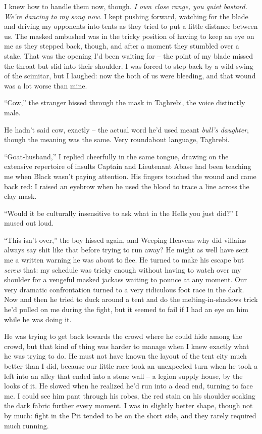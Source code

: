 \documentclass[12pt, openany]{book}
\begin{document}
I knew how to handle them now, though. \textit{I own close range, you quiet bastard. We’re dancing to my song now.} I kept pushing forward, watching for the blade and driving my opponents into tents as they tried to put a little distance between us. The masked ambushed was in the tricky position of having to keep an eye on me as they stepped back, though, and after a moment they stumbled over a stake. That was the opening I’d been waiting for – the point of my blade missed the throat but slid into their shoulder. I was forced to step back by a wild swing of the scimitar, but I laughed: now the both of us were bleeding, and that wound was a lot worse than mine.

“Cow,” the stranger hissed through the mask in Taghrebi, the voice distinctly male.

He hadn’t said cow, exactly – the actual word he’d used meant \textit{bull’s daughter}, though the meaning was the same. Very roundabout language, Taghrebi.

“Goat-husband,” I replied cheerfully in the same tongue, drawing on the extensive repertoire of insults Captain and Lieutenant Abase had been teaching me when Black wasn’t paying attention. His fingers touched the wound and came back red: I raised an eyebrow when he used the blood to trace a line across the clay mask. 

“Would it be culturally insensitive to ask what in the Hells you just did?” I mused out loud.

“This isn’t over,” the boy hissed again, and Weeping Heavens why did villains always say shit like that before trying to run away? He might as well have sent me a written warning he was about to flee. He turned to make his escape but \textit{screw} that: my schedule was tricky enough without having to watch over my shoulder for a vengeful masked jackass waiting to pounce at any moment. Our very dramatic confrontation turned to a very ridiculous foot race in the dark. Now and then he tried to duck around a tent and do the melting-in-shadows trick he’d pulled on me during the fight, but it seemed to fail if I had an eye on him while he was doing it.

He was trying to get back towards the crowd where he could hide among the crowd, but that kind of thing was harder to manage when I knew exactly what he was trying to do. He must not have known the layout of the tent city much better than I did, because our little race took an unexpected turn when he took a left into an alley that ended into a stone wall – a legion supply house, by the looks of it. He slowed when he realized he’d run into a dead end, turning to face me. I could see him pant through his robes, the red stain on his shoulder soaking the dark fabric further every moment. I was in slightly better shape, though not by much: fight in the Pit tended to be on the short side, and they rarely required much running.
\end{document}
